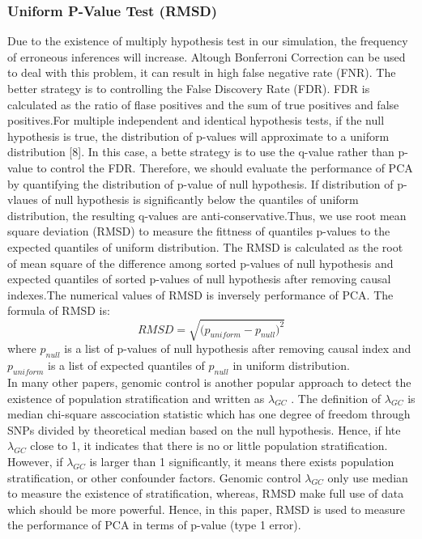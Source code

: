 \documentclass[12pt]{article}
\theoremstyle{definition}
\theoremstyle{plain}
\begin{document}
\subsubsection{Uniform P-Value Test (RMSD)}
Due to the existence of multiply hypothesis test in our simulation, the frequency of erroneous inferences will increase. Altough Bonferroni Correction can be used to deal with this problem, it can result in high false negative rate (FNR). The better strategy is to controlling the False Discovery Rate (FDR). FDR is calculated as the ratio of flase positives and the sum of true positives and false positives.For multiple independent and identical hypothesis tests, if the null hypothesis is true, the distribution of p-values will approximate to a uniform distribution [8]. In this case, a bette strategy is to use the q-value rather than p-value to control the FDR. Therefore, we should evaluate the performance of PCA by quantifying the distribution of p-value of null hypothesis. If distribution of p-vlaues of null hypothesis is significantly below the quantiles of uniform distribution, the resulting q-values are anti-conservative.Thus, we use root mean square deviation (RMSD) to measure the fittness of quantiles p-values to the expected quantiles of uniform distribution. The RMSD is calculated as the root of mean square of the difference among sorted p-values of null hypothesis and expected quantiles of sorted p-values of null hypothesis after removing causal indexes.The numerical values of RMSD is inversely  performance of PCA. The formula of RMSD is:
$$RMSD=\sqrt{{(p_{uniform}-p_{null}})^2}$$
where $p_{null}$ is a list of p-values of null hypothesis after removing causal index and $p_{uniform}$ is a list of expected quantiles of $p_{null}$ in uniform distribution. \\

In many other papers, genomic control is another popular approach to detect the existence of population stratification and written as $\lambda_{GC}$ . The definition of $\lambda_{GC}$ is median chi-square asscociation statistic which has one degree of freedom through SNPs divided by theoretical median based on the null hypothesis. Hence, if hte $\lambda_{GC}$ close to 1, it indicates that there is no or little population stratification. However, if $\lambda_{GC}$ is larger than 1 significantly, it means there exists population stratification, or other confounder factors. Genomic control $\lambda_{GC}$ only use median to measure the existence of stratification, whereas, RMSD make full use of data which should be more powerful. Hence, in this paper, RMSD is used to measure the performance of PCA in terms of p-value (type 1 error).
\end{document}

